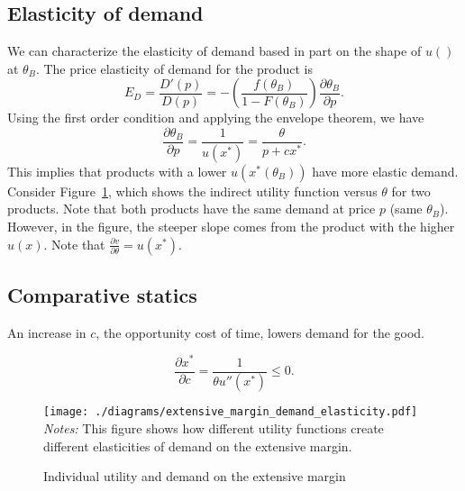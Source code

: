 \documentclass[11pt]{article}
\begin{document}
\subsection{Elasticity of demand}
We can characterize the elasticity of demand based in part on the shape of $u()$ at $\theta_B$. 
The price elasticity of demand for the product is 
\begin{equation} 
E_D = \frac{D'(p)}{D(p)} = - \left(\frac{f(\theta_B)}{1-F(\theta_B)} \right) \frac{\partial \theta_B}{\partial p}. 
\end{equation} 
Using the first order condition and applying the envelope theorem, we have 
\begin{equation}
\frac{\partial \theta_B}{\partial p} = \frac{1}{u(x^*)} = \frac{\theta}{p + cx^*}. 
\end{equation} 
This implies that products with a lower $u(x^*(\theta_B))$ have more elastic demand.  
Consider Figure~\ref{fig:extensive_margin}, which shows the indirect utility function versus $\theta$ for two products. 
Note that both products have the same demand at price $p$ (same $\theta_B$). 
However, in the figure, the steeper slope comes from the product with the higher $u(x)$. 
Note that $\frac{\partial v}{\partial \theta} = u(x^*)$. 

\subsection{Comparative statics} 

\begin{prop}
An increase in $c$, the opportunity cost of time, lowers demand for the good.  
\end{prop} 
\begin{equation}
\frac{\partial x^*}{\partial c} = \frac{1}{\theta u''(x^*)} \le 0. 
\end{equation} 


\begin{figure}
\caption{Individual utility and demand on the extensive margin \label{fig:extensive_margin}} 
\centering 
\begin{minipage}{\textwidth} 
\texttt{[image: ./diagrams/extensive\_margin\_demand\_elasticity.pdf]}
{\footnotesize
\newline \emph{Notes:} This figure shows how different utility functions create different elasticities of demand on the extensive margin.  
}
\end{minipage}  
\end{figure} 
\end{document}
